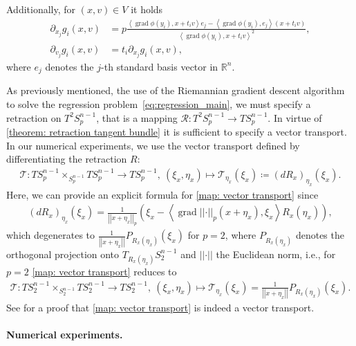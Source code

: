 \documentclass[11pt,a4paper]{article}
\theoremstyle{plain}
\theoremstyle{definition}
\newcommand{\RR}{\mathbb{R}}
\newcommand{\norm}[1]{\left|\left| #1 \right|\right|}
\DeclareMathOperator{\grad}{grad}
\begin{document}
Additionally, for $(x,v)\in V$ it holds
\begin{align*}
	\partial_{x_j}g_i(x, v)
	&= p \frac{\left<\grad\phi(y_i), x + t_iv\right> e_j - \left<\grad\phi(y_i), e_j\right> (x + t_iv)}{\left<\grad\phi(y_i), x + t_iv\right>^2}, \\
	\partial_{v_j}g_i(x, v)
	&= t_i \partial_{x_j}g_i(x, v),
\end{align*}
where $e_j$ denotes the $j$-th standard basis vector in $\RR^n$.

As  previously mentioned, the use of the Riemannian gradient descent algorithm to solve the regression problem~\eqref{eq:regression_main}, we must specify a retraction on $T^2S_p^{n-1}$, that is a mapping $\mathcal{R}\colon T^2S_p^{n-1}\to TS_p^{n-1}$. In virtue of \cref{theorem: retraction tangent bundle} it is sufficient to specify a vector transport. In our numerical experiments, we use the vector transport defined by differentiating the retraction $R$:
\begin{align}
	\label{map: vector transport}
	\mathcal{T}\colon TS_p^{n-1}\times_{S_p^{n-1}} TS_p^{n-1} \to TS_p^{n-1}, \
	(\xi_x, \eta_x)\mapsto \mathcal{T}_{\eta_x}(\xi_x)
	\coloneqq 
	(dR_x)_{\eta_x}(\xi_x).
\end{align}
Here, we can provide an explicit formula for \eqref{map: vector transport} since
\begin{align*}
	(dR_x)_{\eta_x}(\xi_x) = \frac{1}{\norm{x+\eta_x}_p}\left(\xi_x - \left<\grad \norm{\cdot}_p (x + \eta_x), \xi_x\right> R_x(\eta_x)\right),
\end{align*}
which degenerates to $\frac{1}{\norm{x + \eta_x}}P_{R_x(\eta_x)}(\xi_x)$ for $p=2$, where $P_{R_x(\eta_x)}$ denotes the orthogonal projection onto $T_{R_x(\eta_x)}S_2^{n-1}$ and $\norm{\cdot}$ the Euclidean norm, i.e., for $p=2$ \eqref{map: vector transport} reduces to
\begin{align}
	\label{map: vector transport S_2}
	\mathcal{T}\colon TS_2^{n-1}\times_{S_2^{n-1}} TS_2^{n-1} \to TS_2^{n-1}, \
	(\xi_x, \eta_x)\mapsto \mathcal{T}_{\eta_x}(\xi_x)=\frac{1}{\norm{x + \eta_x}}P_{R_x(\eta_x)}(\xi_x).
\end{align}
See \cite[Ex.~8.1.4, p.~172]{absil2008} for a proof that \eqref{map: vector transport} is indeed a vector transport.

\paragraph{Numerical experiments.}
\end{document}
